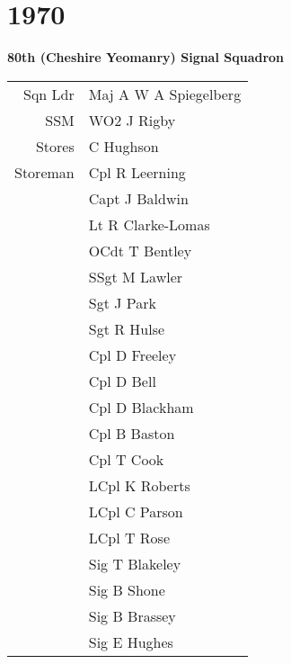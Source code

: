 \chapter*{1970}

\begin{center}
  \Large
  \textbf{80th (Cheshire Yeomanry) Signal Squadron}
\end{center}

\begin{center}
  \begin{tabular}{rl}
    Sqn Ldr & Maj A W A Spiegelberg \\
    SSM & WO2 J Rigby \\
    Stores & C Hughson \\
    Storeman & Cpl R Leerning \\
    & Capt J Baldwin \\
    & Lt R Clarke-Lomas \\
    & OCdt T Bentley \\
    & SSgt M Lawler \\
    & Sgt J Park \\
    & Sgt R Hulse \\
    & Cpl D Freeley \\
    & Cpl D Bell \\
    & Cpl D Blackham \\
    & Cpl B Baston \\
    & Cpl T Cook \\
    & LCpl K Roberts \\
    & LCpl C Parson \\
    & LCpl T Rose \\
    & Sig T Blakeley \\
    & Sig B Shone \\
    & Sig B Brassey \\
    & Sig E Hughes \\
  \end{tabular}
\end{center}

